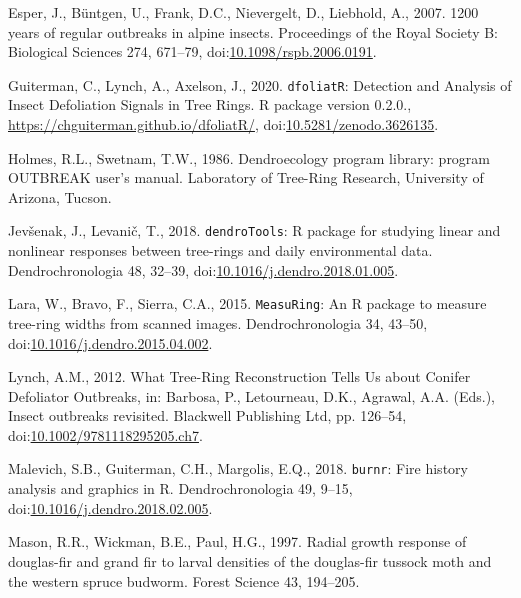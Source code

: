 \documentclass[review]{elsarticle} %
\begin{document}
\leavevmode\hypertarget{ref-Esper2007}{}%
Esper, J., Büntgen, U., Frank, D.C., Nievergelt, D., Liebhold, A., 2007. 1200 years of regular outbreaks in alpine insects. Proceedings of the Royal Society B: Biological Sciences 274, 671--79, doi:\href{https://doi.org/10.1098/rspb.2006.0191}{10.1098/rspb.2006.0191}.

\leavevmode\hypertarget{ref-dfoliatR}{}%
Guiterman, C., Lynch, A., Axelson, J., 2020. \texttt{dfoliatR}: Detection and Analysis of Insect Defoliation Signals in Tree Rings. R package version 0.2.0., \url{https://chguiterman.github.io/dfoliatR/}, doi:\href{https://doi.org/10.5281/zenodo.3626135}{10.5281/zenodo.3626135}.

\leavevmode\hypertarget{ref-outbreak}{}%
Holmes, R.L., Swetnam, T.W., 1986. Dendroecology program library: program OUTBREAK user's manual. Laboratory of Tree-Ring Research, University of Arizona, Tucson.

\leavevmode\hypertarget{ref-Jevsenak2018}{}%
Jevšenak, J., Levanič, T., 2018. \texttt{dendroTools}: R package for studying linear and nonlinear responses between tree-rings and daily environmental data. Dendrochronologia 48, 32--39, doi:\href{https://doi.org/10.1016/j.dendro.2018.01.005}{10.1016/j.dendro.2018.01.005}.

\leavevmode\hypertarget{ref-Lara2015}{}%
Lara, W., Bravo, F., Sierra, C.A., 2015. \texttt{MeasuRing}: An R package to measure tree-ring widths from scanned images. Dendrochronologia 34, 43--50, doi:\href{https://doi.org/10.1016/j.dendro.2015.04.002}{10.1016/j.dendro.2015.04.002}.

\leavevmode\hypertarget{ref-Lynch2012}{}%
Lynch, A.M., 2012. What Tree-Ring Reconstruction Tells Us about Conifer Defoliator Outbreaks, in: Barbosa, P., Letourneau, D.K., Agrawal, A.A. (Eds.), Insect outbreaks revisited. Blackwell Publishing Ltd, pp. 126--54, doi:\href{https://doi.org/10.1002/9781118295205.ch7}{10.1002/9781118295205.ch7}.

\leavevmode\hypertarget{ref-Malevich2018}{}%
Malevich, S.B., Guiterman, C.H., Margolis, E.Q., 2018. \texttt{burnr}: Fire history analysis and graphics in R. Dendrochronologia 49, 9--15, doi:\href{https://doi.org/10.1016/j.dendro.2018.02.005}{10.1016/j.dendro.2018.02.005}.

\leavevmode\hypertarget{ref-Mason1997}{}%
Mason, R.R., Wickman, B.E., Paul, H.G., 1997. Radial growth response of douglas-fir and grand fir to larval densities of the douglas-fir tussock moth and the western spruce budworm. Forest Science 43, 194--205.
\end{document}
